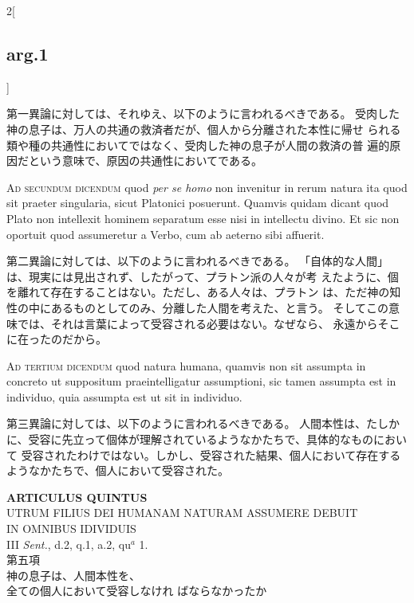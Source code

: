 \documentclass[paper=a4paper,fontsize=10pt,jafontsize=9pt,titlepage]{jlreq}
\begin{document}
\begin{paracol}{2}[\subsection{arg.1}]
\switchcolumn

第一異論に対しては、それゆえ、以下のように言われるべきである。
受肉した神の息子は、万人の共通の救済者だが、個人から分離された本性に帰せ
 られる類や種の共通性においてではなく、受肉した神の息子が人間の救済の普
 遍的原因だという意味で、原因の共通性においてである。

\switchcolumn*[\subsection{ad.2}]

{\scshape Ad secundum dicendum} quod {\itshape per se homo} non invenitur in rerum natura ita
quod sit praeter singularia, sicut Platonici posuerunt. Quamvis quidam
dicant quod Plato non intellexit hominem separatum esse nisi in
intellectu divino. Et sic non oportuit quod assumeretur a Verbo, cum ab
aeterno sibi affuerit.

\switchcolumn

第二異論に対しては、以下のように言われるべきである。
「自体的な人間」は、現実には見出されず、したがって、プラトン派の人々が考
 えたように、個を離れて存在することはない。ただし、ある人々は、プラトン
 は、ただ神の知性の中にあるものとしてのみ、分離した人間を考えた、と言う。
 そしてこの意味では、それは言葉によって受容される必要はない。なぜなら、
 永遠からそこに在ったのだから。

\switchcolumn*[\subsection{ad.3}]

{\scshape Ad tertium dicendum} quod natura humana, quamvis non sit assumpta in
concreto ut suppositum praeintelligatur assumptioni, sic tamen assumpta
est in individuo, quia assumpta est ut sit in individuo.

\switchcolumn

第三異論に対しては、以下のように言われるべきである。
人間本性は、たしかに、受容に先立って個体が理解されているようなかたちで、具体的なものにおいて
 受容されたわけではない。しかし、受容された結果、個人において存在するようなかたちで、個人において受容された。

\end{paracol}
\newpage




{}
\setcounter{section}{5}
\setcounter{subsection}{0}
\begin{center}
 {\Large {\bfseries ARTICULUS QUINTUS}}\\
 {\large UTRUM FILIUS DEI HUMANAM NATURAM ASSUMERE DEBUIT\\ IN OMNIBUS IDIVIDUIS}\\
 {\footnotesize III {\itshape Sent.}, d.2, q.1, a.2, qu$^a$ 1.}\\
 {\Large 第五項\\神の息子は、人間本性を、\\全ての個人において受容しなけれ
 ばならなかったか}
\end{center}
\end{document}
